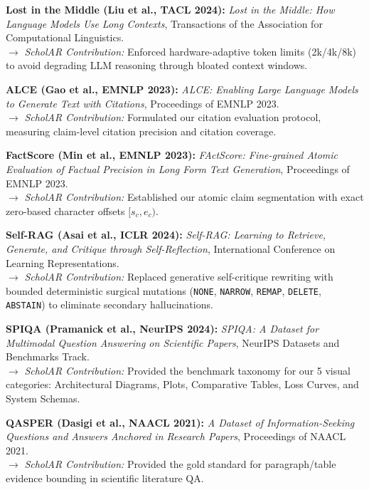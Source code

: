 \documentclass[11pt,a4paper]{article}
\begin{document}
\begin{enumerate}[leftmargin=*,label={[\arabic*]}]
    \item \textbf{Lost in the Middle (Liu et al., TACL 2024):} \emph{Lost in the Middle: How Language Models Use Long Contexts}, Transactions of the Association for Computational Linguistics. \\
    $\rightarrow$ \emph{ScholAR Contribution:} Enforced hardware-adaptive token limits (2k/4k/8k) to avoid degrading LLM reasoning through bloated context windows.
    
    \item \textbf{ALCE (Gao et al., EMNLP 2023):} \emph{ALCE: Enabling Large Language Models to Generate Text with Citations}, Proceedings of EMNLP 2023. \\
    $\rightarrow$ \emph{ScholAR Contribution:} Formulated our citation evaluation protocol, measuring claim-level citation precision and citation coverage.
    
    \item \textbf{FactScore (Min et al., EMNLP 2023):} \emph{FActScore: Fine-grained Atomic Evaluation of Factual Precision in Long Form Text Generation}, Proceedings of EMNLP 2023. \\
    $\rightarrow$ \emph{ScholAR Contribution:} Established our atomic claim segmentation with exact zero-based character offsets $[s_c, e_c)$.
    
    \item \textbf{Self-RAG (Asai et al., ICLR 2024):} \emph{Self-RAG: Learning to Retrieve, Generate, and Critique through Self-Reflection}, International Conference on Learning Representations. \\
    $\rightarrow$ \emph{ScholAR Contribution:} Replaced generative self-critique rewriting with bounded deterministic surgical mutations (\texttt{NONE}, \texttt{NARROW}, \texttt{REMAP}, \texttt{DELETE}, \texttt{ABSTAIN}) to eliminate secondary hallucinations.
    
    \item \textbf{SPIQA (Pramanick et al., NeurIPS 2024):} \emph{SPIQA: A Dataset for Multimodal Question Answering on Scientific Papers}, NeurIPS Datasets and Benchmarks Track. \\
    $\rightarrow$ \emph{ScholAR Contribution:} Provided the benchmark taxonomy for our 5 visual categories: Architectural Diagrams, Plots, Comparative Tables, Loss Curves, and System Schemas.
    
    \item \textbf{QASPER (Dasigi et al., NAACL 2021):} \emph{A Dataset of Information-Seeking Questions and Answers Anchored in Research Papers}, Proceedings of NAACL 2021. \\
    $\rightarrow$ \emph{ScholAR Contribution:} Provided the gold standard for paragraph/table evidence bounding in scientific literature QA.
    

\end{enumerate}
\end{document}
